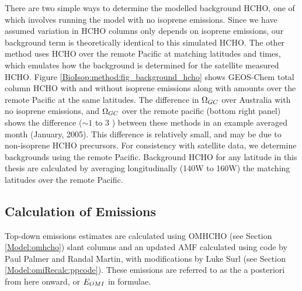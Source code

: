     There are two simple ways to determine the modelled background HCHO, one of which involves running the model with no isoprene emissions.%
    Since we have assumed variation in HCHO columns only depends on isoprene emissions, our background term is theoretically identical to this simulated HCHO.
    The other method uses HCHO over the remote Pacific at matching latitudes and times, which emulates how the background is determined for the satellite measured HCHO.
    Figure \ref{BioIsop:method:fig_background_hcho} shows GEOS-Chem total column HCHO with and without isoprene emissions along with amounts over the remote Pacific at the same latitudes.
    The difference in $\Omega_{GC}$ over Australia with no isoprene emissions, and $\Omega_{GC}$ over the remote pacific (bottom right panel) shows the difference ($\sim 1$ to $3$ \moleccm) between these methods in an example averaged month (January, 2005).
    This difference is relatively small, and may be due to non-isoprene HCHO precursors.
    For consistency with satellite data, we determine backgrounds using the remote Pacific.
    Background HCHO for any latitude in this thesis are calculated by averaging longitudinally (140\degr W to 160\degr W) the matching latitudes over the remote Pacific.
    
    
    
  \subsection{Calculation of Emissions}
    \label{BioIsop:method:calculation}
   
    Top-down emissions estimates are calculated using OMHCHO (see Section \ref{Model:omhcho}) slant columns and an updated AMF calculated using code by Paul Palmer and Randal Martin, with modifications by Luke Surl (see Section \ref{Model:omiRecalc:ppcode}).
    These emissions are referred to as the a posteriori from here onward, or $E_{OMI}$ in formulae.
    

